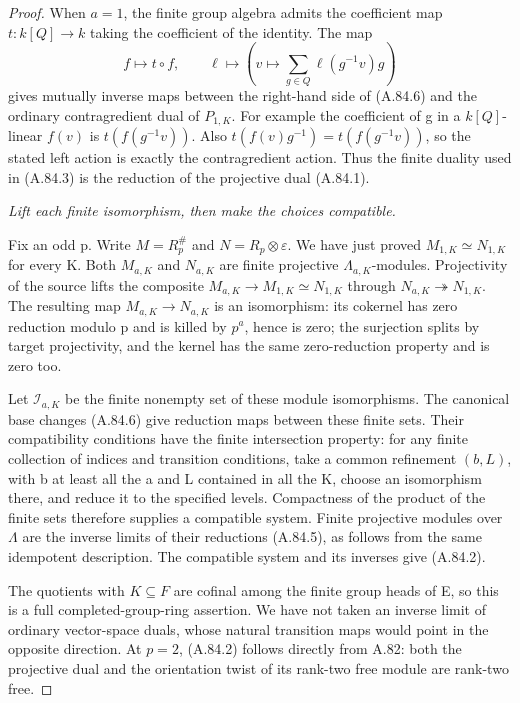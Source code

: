 \begin{proof}
When \(a=1\), the finite group algebra admits the coefficient map
\(t:k[Q]\to k\) taking the coefficient of the identity. The map
\[
 f\longmapsto t\circ f,
 \qquad
 \ell\longmapsto\left(v\longmapsto
                  \sum_{g\in Q}\ell(g^{-1}v)g\right)
 \tag{A.84.7}
\]
gives mutually inverse maps between the right-hand side of
(A.84.6) and the ordinary contragredient dual of \(P_{1,K}\).
For example the coefficient of g in a \(k[Q]\)-linear \(f(v)\)
is \(t(f(g^{-1}v))\). Also
\(t(f(v)g^{-1})=t(f(g^{-1}v))\), so the stated left action is
exactly the contragredient action. Thus the finite duality used in
(A.84.3) is the reduction of the projective dual (A.84.1).

\emph{Lift each finite isomorphism, then make the choices compatible.}\par
Fix an odd p. Write \(M=R_p^\#\) and
\(N=R_p\otimes\varepsilon\). We have just proved
\(M_{1,K}\simeq N_{1,K}\) for every K. Both \(M_{a,K}\) and
\(N_{a,K}\) are finite projective \(\Lambda_{a,K}\)-modules.
Projectivity of the source lifts the composite
\(M_{a,K}\to M_{1,K}\simeq N_{1,K}\) through
\(N_{a,K}\twoheadrightarrow N_{1,K}\). The resulting map
\(M_{a,K}\to N_{a,K}\) is an isomorphism: its cokernel has zero
reduction modulo p and is killed by \(p^a\), hence is zero;
the surjection splits by target projectivity, and the kernel has
the same zero-reduction property and is zero too.

Let \(\mathcal I_{a,K}\) be the finite nonempty set of these
module isomorphisms. The canonical base changes (A.84.6) give
reduction maps between these finite sets. Their compatibility
conditions have the finite intersection property: for any finite
collection of indices and transition conditions, take a common
refinement \((b,L)\), with b at least all the a and L contained
in all the K, choose an isomorphism there, and reduce it to the
specified levels. Compactness of the product of the finite sets
therefore supplies a compatible system. Finite projective modules
over \(\Lambda\) are the inverse limits of their reductions
(A.84.5), as follows from the same idempotent description.
The compatible system and its inverses give (A.84.2).

The quotients with \(K\subseteq F\) are cofinal among the finite
group heads of E, so this is a full completed-group-ring assertion.
We have not taken an inverse limit of ordinary vector-space duals,
whose natural transition maps would point in the opposite direction.
At \(p=2\), (A.84.2) follows directly from A.82: both the projective
dual and the orientation twist of its rank-two free module are
rank-two free.


\end{proof}

